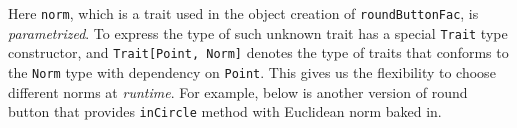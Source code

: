 Here \lstinline{norm}, which is a trait used in the object creation of
\lstinline{roundButtonFac}, is \emph{parametrized}. To express the
type of such unknown trait \name has a special 
\lstinline{Trait} type constructor, and \lstinline$Trait[Point, Norm]$
denotes the type of traits that conforms to the \lstinline$Norm$ type with dependency
on \lstinline{Point}. This gives us the
flexibility to choose different norms at \emph{runtime}. For example, below is another version of
round button that provides \lstinline{inCircle} method with Euclidean norm baked
in.

